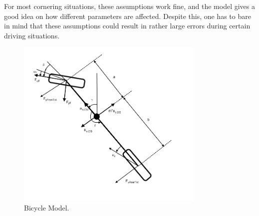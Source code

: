 For most cornering situations, these assumptions work fine, and the model gives a good idea on how different parameters are affected. Despite this, one has to bare in mind that these assumptions could result in rather large errors during certain driving situations.

\begin{figure}[h]
	\centering
	\includegraphics[width=0.8\textwidth]{Pictures/bicycle_model}
	\caption {Bicycle Model. \cite{fordonsdynamik99}}
	\label{bicycle_model}
\end{figure}

